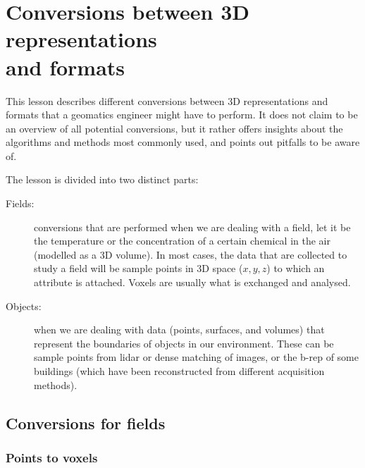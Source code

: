 
\setchapterpreamble[u]{\margintoc}

\graphicspath{{conversion/}}

\chapter{Conversions between 3D representations\\ and formats}%
\label{chap:conversion}

This lesson describes different conversions between 3D representations and formats that a geomatics engineer might have to perform.
It does not claim to be an overview of all potential conversions, but it rather offers insights about the algorithms and methods most commonly used, and points out pitfalls to be aware of.

%

The lesson is divided into two distinct parts:
\begin{description}
  \item[Fields:] conversions that are performed when we are dealing with a field, let it be the temperature or the concentration of a certain chemical in the air (modelled as a 3D volume). 
  In most cases, the data that are collected to study a field will be sample points in 3D space ($x,y,z$) to which an attribute is attached. 
  Voxels are usually what is exchanged and analysed.
  \item[Objects:] when we are dealing with data (points, surfaces, and volumes) that represent the boundaries of objects in our environment. 
  These can be sample points from lidar or dense matching of images, or the b-rep of some buildings (which have been reconstructed from different acquisition methods).
\end{description}



\newpage
%
\section{Conversions for fields}


\subsection{Points to voxels}

